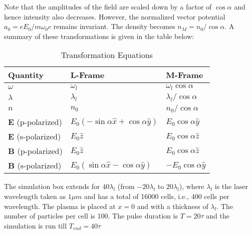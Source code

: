 Note that the amplitudes of the field are scaled down by a factor of $\cos\alpha$ and hence intensity also decreases. However, the normalized vector potential $a_0 = eE_0/m\omega_0c$ remains invariant. The density becomes $n_M = n_0/\cos\alpha$. A summary of these transformations is given in the table below:
\begin{table}[h]
    \centering
    \caption{Transformation Equations}
    \label{tab:transformation}
    \vspace{0.3cm}
    \begin{tabular}{|l|l|l|}
        \hline
        \textbf{Quantity}          & \textbf{L-Frame}                                 & \textbf{M-Frame}          \\ \hline
        $\omega$                   & $\omega_l$                                       & $\omega_l \cos\alpha$     \\ \hline
        $\lambda$                  & $\lambda_l$                                      & $\lambda_l/\cos\alpha$    \\ \hline
        $n$                        & $n_0$                                            & $n_0/\cos\alpha$          \\ \hline
        $\mathbf{E}$ (p-polarized) & $E_0 (-\sin\alpha \hat{x} + \cos\alpha \hat{y})$ & $E_0 \cos\alpha \hat{y}$  \\ \hline
        $\mathbf{E}$ (s-polarized) & $E_0 \hat{z}$                                    & $E_0 \cos\alpha \hat{z}$  \\ \hline
        $\mathbf{B}$ (p-polarized) & $E_0 \hat{z}$                                    & $E_0 \cos\alpha \hat{z}$  \\ \hline
        $\mathbf{B}$ (s-polarized) & $E_0 (\sin\alpha \hat{x} - \cos\alpha \hat{y})$  & $-E_0 \cos\alpha \hat{y}$ \\ \hline
    \end{tabular}
\end{table}
\label{sec:oblique_hhg}
The simulation box extends for $40 \lambda _l$ (from $-20 \lambda _l$ to $20 \lambda _l$), where $\lambda_l$ is the laser wavelength taken as $1\mu m$ and has a total of 16000 cells, i.e., 400 cells per wavelength. The plasma is placed at $x=0$ and with a thickness of $\lambda_l$. The number of particles per cell is 100. The pulse duration is $T = 20 \tau$ and the simulation is run till $T_{end} = 40 \tau$
